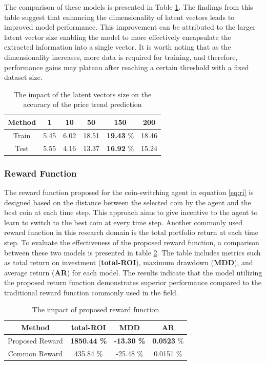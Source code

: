 The comparison of these models is presented in Table \ref{tbl:FE-dim}. The findings from this table suggest that enhancing the dimensionality of latent vectors leads to improved model performance. This improvement can be attributed to the larger latent vector size enabling the model to more effectively encapsulate the extracted information into a single vector. It is worth noting that as the dimensionality increases, more data is required for training, and therefore, performance gains may plateau after reaching a certain threshold with a fixed dataset size.


\begin{table}[h]
	\centering
	\caption{The impact of the latent vectors size on the accuracy of the price trend prediction}
	\label{tbl:FE-dim}
	\begin{tabular}{c | c | c | c | c | c }
		Method & 1 & 10 & 50 & 150 & 200 \\
		\hline
		\hline
		Train & 5.45& 6.02 & 18.51 & \textbf{19.43} \% & 18.46\\
		Test & 5.55& 4.16 & 13.37 & \textbf{16.92} \% & 15.24\\
	\end{tabular}
\end{table}

\subsubsection{Reward Function}
The reward function proposed for the coin-switching agent in equation \ref{eq:ri} is designed based on the distance between the selected coin by the agent and the best coin at each time step. This approach aims to give incentive to the agent to learn to switch to the best coin at every time step. Another commonly used reward function in this research domain is the total portfolio return at each time step. To evaluate the effectiveness of the proposed reward function, a comparison between these two models is presented in table \ref{tbl:rewards}. The table includes metrics such as total return on investment (\textbf{total-ROI}), maximum drawdown (\textbf{MDD}), and average return (\textbf{AR}) for each model. The results indicate that the model utilizing the proposed return function demonstrates superior performance compared to the traditional reward function commonly used in the field.


\begin{table}[h]
	\centering
	\caption{The impact of proposed reward function}
	\label{tbl:rewards}
	\begin{tabular}{c | c | c | c  }
		Method & total-ROI & MDD & AR \\
		\hline
		\hline
		Proposed Reward & \textbf{1850.44 \%}  & \textbf{-13.30 \%} & \textbf{0.0523}  \% \\
		Common Reward & 435.84 \%  & -25.48 \%  & 0.0151 \%\\
	\end{tabular}
\end{table}

